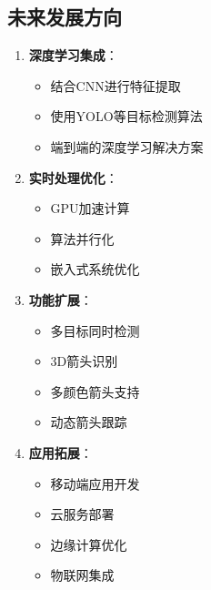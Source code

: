 \documentclass[12pt]{article}
\begin{document}
\subsection{未来发展方向}

\begin{enumerate}
    \item \textbf{深度学习集成}：
    \begin{itemize}
        \item 结合CNN进行特征提取
        \item 使用YOLO等目标检测算法
        \item 端到端的深度学习解决方案
    \end{itemize}
    
    \item \textbf{实时处理优化}：
    \begin{itemize}
        \item GPU加速计算
        \item 算法并行化
        \item 嵌入式系统优化
    \end{itemize}
    
    \item \textbf{功能扩展}：
    \begin{itemize}
        \item 多目标同时检测
        \item 3D箭头识别
        \item 多颜色箭头支持
        \item 动态箭头跟踪
    \end{itemize}
    
    \item \textbf{应用拓展}：
    \begin{itemize}
        \item 移动端应用开发
        \item 云服务部署
        \item 边缘计算优化
        \item 物联网集成
    \end{itemize}
\end{enumerate}
\end{document}
